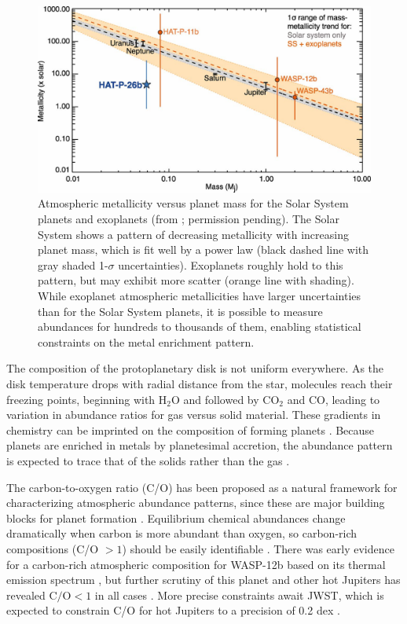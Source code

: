 \documentclass[graybox,natbib,nosecnum]{svmult}
\begin{document}
\begin{figure}
\begin{centering}
\includegraphics[scale=.8]{Figures/wakeford.jpg}
\caption{Atmospheric metallicity versus planet mass for the Solar System planets and exoplanets (from \citealt{wakeford17}; permission pending). The Solar System shows a pattern of decreasing metallicity with increasing planet mass, which is fit well by a power law (black dashed line with gray shaded 1-$\sigma$ uncertainties). Exoplanets roughly hold to this pattern, but may exhibit more scatter (orange line with shading). While exoplanet atmospheric metallicities have larger uncertainties than for the Solar System planets, it is possible to measure abundances for hundreds to thousands of them, enabling statistical constraints on the metal enrichment pattern.} 
\label{fig:massZ}       
\end{centering}
\end{figure}

The composition of the protoplanetary disk is not uniform everywhere. As the disk temperature drops with radial distance from the star, molecules reach their freezing points, beginning with H$_2$O and followed by CO$_2$ and CO, leading to variation in abundance ratios for gas versus solid material. These gradients in chemistry can be imprinted on the composition of forming planets \citep[e.g.][]{oberg11, madhusudhan14, alidib16}. Because planets are enriched in metals by planetesimal accretion, the abundance pattern is expected to trace that of the solids rather than the gas \citep{mordasini16, espinoza17}.

The carbon-to-oxygen ratio (C/O) has been proposed as a natural framework for characterizing atmospheric abundance patterns, since these are major building blocks for planet formation \citep{madhusudhan12}.  Equilibrium chemical abundances change dramatically when carbon is more abundant than oxygen, so carbon-rich compositions (C/O $> 1$) should be easily identifiable \citep{moses13}.  There was early evidence for a carbon-rich atmospheric composition for WASP-12b based on its thermal emission spectrum \citep{madhusudhan11}, but further scrutiny of this planet and other hot Jupiters has revealed $\mathrm{C/O} < 1$ in all cases \citep{line14, kreidberg15b, benneke15, barstow17}. More precise constraints await JWST, which is expected to constrain C/O for hot Jupiters to a precision of 0.2 dex \citep{greene16}.
\end{document}
